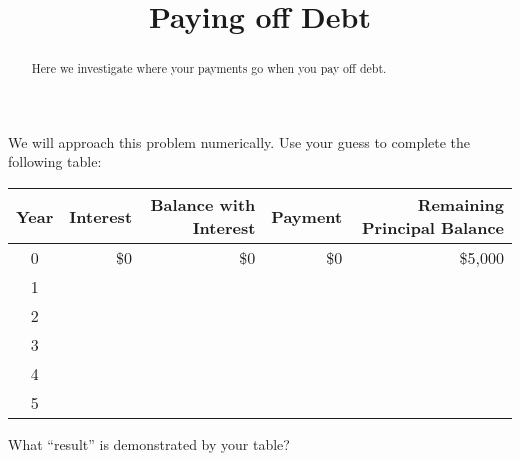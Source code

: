 \documentclass[,nooutcomes]{ximera}
\title{Paying off Debt}
\begin{document}
\begin{abstract}
Here we investigate where your payments go when you pay off debt.
\end{abstract}
\maketitle


\begin{question}
We will approach this problem numerically.  Use your guess to complete the following table:  

\def\arraystretch{2}
\begin{table}[h]
\begin{tabular}{|c|r|r|r|r|}
\hline
Year & Interest & Balance with Interest & Payment & Remaining Principal Balance \\ \hline
0    &   \$0   &    \$0           &   \$0    & \$5,000                  \\ \hline
1    &          &                     &         &                             \\ \hline
2    &          &                     &         &                             \\ \hline
3    &          &                     &         &                             \\ \hline
4    &          &                     &         &                             \\ \hline
5    &          &                     &         &                             \\ \hline
\end{tabular}
\end{table}
What ``result'' is demonstrated by your table?  
\begin{freeResponse}
\end{freeResponse}
\end{question}
\end{document}
